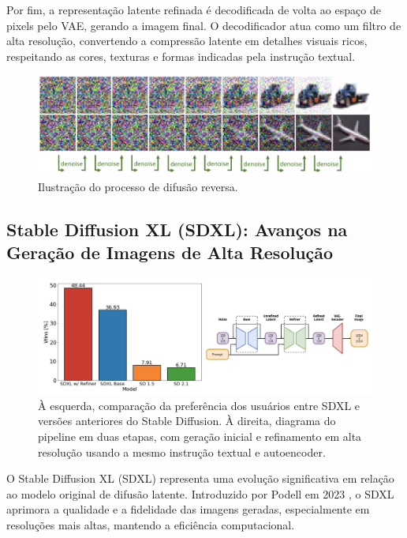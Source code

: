 \documentclass[12pt, %
openright, 
oneside, %
a4paper,    %
brazil]{facom-ufu-abntex2}
\begin{document}
Por fim, a representação latente refinada é decodificada de volta ao espaço de pixels pelo VAE, gerando a imagem final. O decodificador atua como um filtro de alta resolução, convertendo a compressão latente em detalhes visuais ricos, respeitando as cores, texturas e formas indicadas pela instrução textual.

\begin{figure}[H]
    \centering
	\includegraphics[width=\linewidth]{denoising.png}
	\caption{Ilustração do processo de difusão reversa.}
	\label{fig:denoising}
\end{figure}

\subsection{Stable Diffusion XL (SDXL): Avanços na Geração de Imagens de Alta Resolução}

\begin{figure}[H]
    \centering
        \includegraphics[width=1.0\linewidth]{comparacao_pipeline_sdxl.png}
        \caption[Comparação e pipeline em duas etapas do SDXL]{À esquerda, comparação da preferência dos usuários entre SDXL e versões anteriores do Stable Diffusion. À direita, diagrama do pipeline em duas etapas, com geração inicial e refinamento em alta resolução usando a mesmo instrução textual e autoencoder.}
        \label{fig:comparacaoPipelineSdxl}
\end{figure}

O Stable Diffusion XL (SDXL) representa uma evolução significativa em relação ao modelo original de difusão latente. Introduzido por Podell em 2023 \cite{podell2023sdxlimprovinglatentdiffusion}, o SDXL aprimora a qualidade e a fidelidade das imagens geradas, especialmente em resoluções mais altas, mantendo a eficiência computacional.
\end{document}
